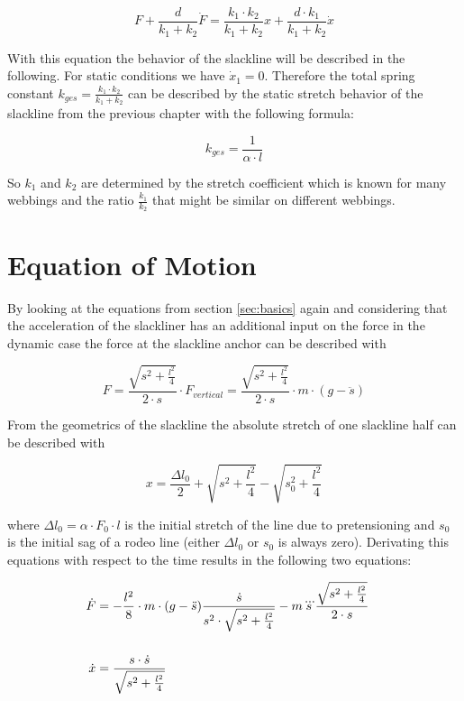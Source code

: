 \begin{equation}
	F + \frac{d}{k_1 + k_2} \dot F = \frac{k_1 \cdot k_2}{k_1 + k_2} x + \frac{d \cdot k_1}{k_1 + k_2} \dot x
	\label{eqn:linearSolidModel}
\end{equation}

With this equation the behavior of the slackline will be described in the following. For static conditions we have $\dot x_1 = 0$. Therefore the total spring constant $k_{ges} = \frac{k_1 \cdot k_2}{k_1 + k_2}$ can be described by the static stretch behavior of the slackline from the previous chapter with the following formula:

\begin{equation}
	k_{ges} = \frac{1}{\alpha \cdot l}
\end{equation}

So $k_1$ and $k_2$ are determined by the stretch coefficient which is known for many webbings and the ratio $\frac{k_1}{k_2}$ that might be similar on different webbings.

\section{Equation of Motion}

By looking at the equations from section \ref{sec:basics} again and considering that the acceleration of the slackliner has an additional input on the force in the dynamic case the force at the slackline anchor can be described with

\begin{equation}
	F = \frac{\sqrt{s^2 + \frac{l^2}{4}}}{2 \cdot s} \cdot F_{vertical} = \frac{\sqrt{s^2 + \frac{l^2}{4}}}{2 \cdot s} \cdot m\cdot (g - \ddot s)
\end{equation}

From the geometrics of the slackline the absolute stretch of one slackline half can be described with

\begin{equation}
	x = \frac{\Delta l_0}{2} + \sqrt{s^2 + \frac{l^2}{4}} - \sqrt{s_0^2 + \frac{l^2}{4}}
\end{equation}

where $\Delta l_0 = \alpha \cdot F_0 \cdot l$ is the initial stretch of the line due to pretensioning and $s_0$ is the initial sag of a rodeo line (either $\Delta l_0$ or $s_0$ is always zero). Derivating this equations with respect to the time results in the following two equations:

\begin{align}
	\dot F & \begin{multlined}[t]=  -\frac{l^2}{8}\cdot m \cdot (g - \ddot s) \frac{\dot s}{s^2 \cdot \sqrt{s^2 + \frac{l^2}{4}}} - \insertForSmartphone{\\}
	m \dddot s \frac{\sqrt{s^2 + \frac{l^2}{4}}}{2 \cdot s} \\
	\end{multlined}\\
	\dot x &= \frac{s \cdot \dot s}{\sqrt{s^2 + \frac{l^2}{4}}}
\end{align}

